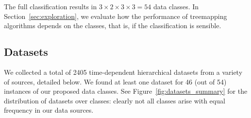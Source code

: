 


\medskip
\noindent
The full classification results in $3 \times 2 \times 3 \times 3 = 54$ data classes. In Section~\ref{sec:exploration}, we evaluate how the performance of treemapping algorithms depends on the classes, that is, if the classification is sensible. 



\subsection{Datasets}
\label{sec:datasets-2}
%
We collected a total of 2405 time-dependent hierarchical datasets from a variety of sources, detailed below. We found at least one dataset for 46 (out of 54) instances of our proposed data classes. See Figure~\ref{fig:datasets_summary} for the distribution of datasets over classes: clearly not all classes arise with equal frequency in our data sources.

